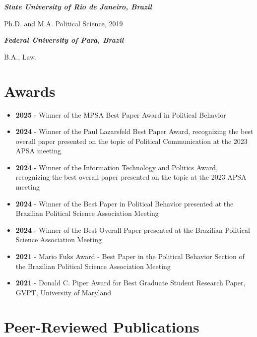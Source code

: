 \documentclass[letterpaper, 11pt]{article}
\begin{document}
\vspace{.3cm}

\textit{\textbf{State University of Rio de Janeiro, Brazil}}

Ph.D. and M.A. Political Science, 2019

\vspace{.3cm}

\textit{\textbf{Federal University of Para, Brazil}}

B.A.,  Law.

\section*{Awards}

    \begin{itemize}[leftmargin=0cm]
        \item \textbf{2025} - Winner of the MPSA Best Paper Award in Political Behavior
        \item \textbf{2024} - Winner of the Paul Lazarsfeld Best Paper Award, recognizing the best overall paper presented on the topic of Political Communication at the 2023 APSA meeting
        \item \textbf{2024} - Winner of the Information Technology and Politics Award, recognizing the best overall paper presented on the topic at the 2023 APSA meeting
        \item \textbf{2024} - Winner of the Best Paper in Political Behavior presented at the Brazilian Political Science Association Meeting
        \item \textbf{2024} - Winner of the Best Overall Paper presented at the Brazilian Political Science Association Meeting
        \item \textbf{2021} - Mario Fuks Award - Best Paper in the Political Behavior Section of the Brazilian Political Science Association Meeting
        \item \textbf{2021} - Donald C. Piper Award for Best Graduate Student Research Paper, GVPT, University of Maryland
    \end{itemize}

\section*{Peer-Reviewed Publications}
\end{document}
